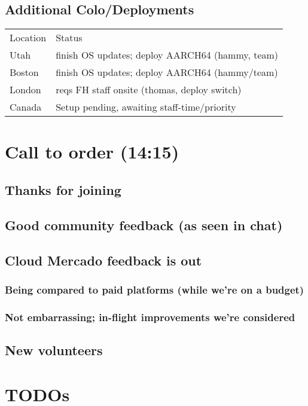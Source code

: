 \documentclass[11pt]{article}
\begin{document}
\subsection{Additional Colo/Deployments}
\label{sec:org817e9cb}
\begin{center}
\begin{tabular}{ll}
Location & Status\\
Utah & finish OS updates; deploy AARCH64 (hammy, team)\\
Boston & finish OS updates; deploy AARCH64 (hammy/team)\\
London & reqs FH staff onsite (thomas, deploy switch)\\
Canada & Setup pending, awaiting staff-time/priority\\
\end{tabular}
\end{center}

\section{Call to order (14:15)}
\label{sec:org6af6758}
\subsection{Thanks for joining}
\label{sec:org787a882}
\subsection{Good community feedback (as seen in chat)}
\label{sec:org0604b51}
\subsection{Cloud Mercado feedback is out}
\label{sec:org5e835a8}
\subsubsection{Being compared to paid platforms (while we're on a budget)}
\label{sec:org8f9ff6a}
\subsubsection{Not embarrassing; in-flight improvements we're considered}
\label{sec:org92bcc98}
\subsection{New volunteers}
\label{sec:org816b339}
\section{TODOs}
\label{sec:org7baa21d}
\end{document}

